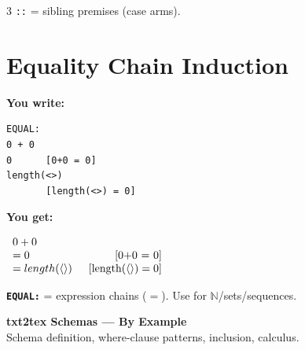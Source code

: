 \documentclass[10pt,landscape,a4paper]{article}
\newcommand{\kw}[1]{\texttt{\bfseries #1}}
\newenvironment{exwrite}%
  {\par\noindent\scriptsize\textbf{You write:}\par\vspace{0pt}\scriptsize}%
  {\vspace{1pt}}
\newenvironment{exget}%
  {\par\noindent\scriptsize\textbf{You get:}\par\vspace{0pt}\small}%
  {\par\vspace{3pt}}
\begin{document}
\begin{multicols}{3}
{\scriptsize \texttt{::} = sibling premises (case arms).}


\section{Equality Chain {\normalsize\color{gray}\textrm{\scriptsize Induction}}}

\begin{exwrite}%
\begin{verbatim}
EQUAL:
0 + 0
0      [0+0 = 0]
length(<>)
       [length(<>) = 0]
\end{verbatim}
\end{exwrite}
\begin{exget}%
\begin{center}
$\begin{array}{l@{\hspace{1.5em}}r}
0 + 0 \\
= 0 & [\mbox{0+0 = 0}] \\
= length(\langle\rangle) & [\mbox{length}(\langle\rangle) = 0]
\end{array}$
\end{center}
\end{exget}

{\scriptsize \kw{EQUAL:} = expression chains ($=$). Use for $\mathbb{N}$/sets/sequences.}

\end{multicols}

\newpage

\begin{center}
{\LARGE\bfseries txt2tex Schemas --- By Example}\\[2pt]
{\small Schema definition, where-clause patterns, inclusion, calculus.}
\end{center}

\vspace{-2pt}
\end{document}
